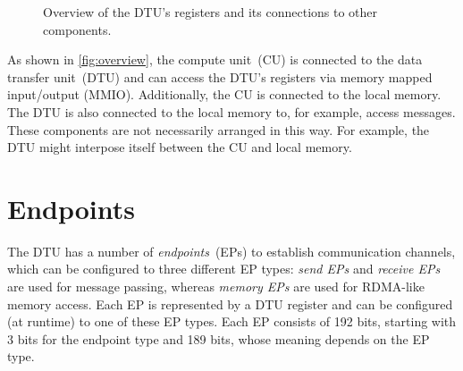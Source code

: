 \documentclass[a4paper,11pt,draft]{article}
\newcommand{\rref}[2][]{\autoref{#2}}
\begin{document}
\begin{figure}[h]
  \caption{Overview of the DTU's registers and its connections to other components.}
  \label{fig:overview}
\end{figure}

As shown in \rref{fig:overview}, the compute unit~(CU) is connected to the data transfer unit~(DTU)
and can access the DTU's registers via memory mapped input/output (MMIO). Additionally, the CU is
connected to the local memory. The DTU is also connected to the local memory to, for example, access
messages. These components are not necessarily arranged in this way. For example, the DTU might
interpose itself between the CU and local memory.

\section{Endpoints}

The DTU has a number of \emph{endpoints}~(EPs) to establish communication channels, which can be
configured to three different EP types: \emph{send EPs} and \emph{receive EPs} are used for message
passing, whereas \emph{memory EPs} are used for RDMA-like memory access. Each EP is represented by a
DTU register and can be configured (at runtime) to one of these EP types. Each EP consists of 192
bits, starting with 3 bits for the endpoint type and 189 bits, whose meaning depends on the EP type.
\end{document}
